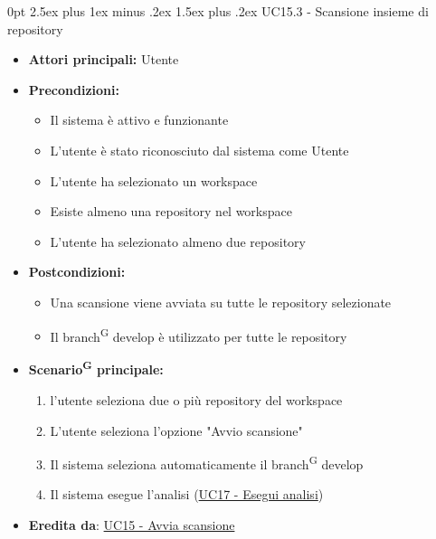 \documentclass[a4paper, 11pt]{article}
\makeatletter
\renewcommand\paragraph{\@startsection{paragraph}{4}
  {0pt}
  {2.5ex plus 1ex minus .2ex}
  {1.5ex plus .2ex}
  {\normalfont\normalsize\bfseries\color{AccentDark}}}
\makeatother
\begin{document}
\paragraph{UC15.3 - Scansione insieme di repository} \label{UC15.3}
\begin{itemize}
	\item \textbf{Attori principali:} Utente
	\item \textbf{Precondizioni:}
	\begin{itemize}
		\item Il sistema è attivo e funzionante
		\item L'utente è stato riconosciuto dal sistema come Utente
		\item L'utente ha selezionato un workspace
		\item Esiste almeno una repository nel workspace
		\item L'utente ha selezionato almeno due repository
	\end{itemize}
	\item \textbf{Postcondizioni:}
	\begin{itemize}
		\item Una scansione viene avviata su tutte le repository selezionate
		\item Il branch\textsuperscript{G} develop è utilizzato per tutte le repository
	\end{itemize}
	\item \textbf{Scenario\textsuperscript{G} principale:}
	\begin{enumerate}
		\item l'utente seleziona due o più repository del workspace
		\item L'utente seleziona l'opzione "Avvio scansione"
		\item Il sistema seleziona automaticamente il branch\textsuperscript{G} develop
		\item Il sistema esegue l'analisi (\hyperref[UC17]{UC17 - Esegui analisi})
	\end{enumerate}
	\item \textbf{Eredita da}: \hyperref[UC15]{UC15 - Avvia scansione}
\end{itemize}
\end{document}
